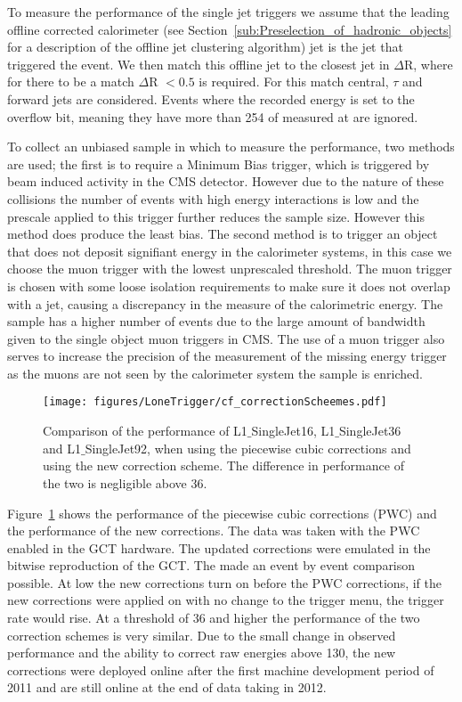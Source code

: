 To measure the performance of the \Lone single jet triggers we assume that the 
leading offline corrected \AK calorimeter (see 
Section~\ref{sub:Preselection_of_hadronic_objects} for a description of the 
offline jet clustering algorithm) jet is the jet that triggered the 
event. We then match this offline jet to the closest \Lone jet in $\Delta$R, 
where for there to be a match $\Delta$R $< 0.5$ is required. For this match 
central, $\tau$ and forward jets are considered. Events where the recorded 
\Lone energy is set to the overflow bit, meaning they have more than 
\unit{254}{\GeV} of \ET measured at \Lone are ignored.

To collect an unbiased sample in which to measure the performance, two 
methods are used; the first is to require a Minimum Bias trigger, which is 
triggered by beam induced activity in the CMS detector.
However due to the nature of these collisions the number of events with high 
energy interactions is low and the prescale applied to this trigger further 
reduces the sample size. However this method does produce the least bias.
The second method is to trigger an object that does not deposit signifiant 
energy in the calorimeter systems, in this case we choose the muon trigger with 
the lowest unprescaled \PT threshold. The muon trigger is chosen with some 
loose isolation requirements to make sure it does not overlap with a jet, 
causing a discrepancy in the measure of the calorimetric energy. The sample has 
a higher number of events due to the large amount of bandwidth given to the 
single object muon triggers in CMS. The use of a muon trigger also serves to 
increase the precision of the measurement of the \Lone missing energy trigger 
as the muons are not seen by the calorimeter system the \MET sample is enriched.

\begin{figure}[htbp]
  \centering
    \texttt{[image: figures/LoneTrigger/cf\_correctionScheemes.pdf]}
  \caption{Comparison of the performance of L1$\_$SingleJet16, L1$\_$SingleJet36 and L1$\_$SingleJet92, when using the piecewise cubic corrections and using the new correction scheme. The difference in performance of the two is negligible above 36\GeV.}
  \label{fig:figures_LoneTrigger_cf_correctionScheemes}
\end{figure}

Figure~\ref{fig:figures_LoneTrigger_cf_correctionScheemes} shows the 
performance of the piecewise cubic corrections (PWC) and the performance of the 
new corrections. The data was taken with the PWC enabled in the GCT hardware. 
The updated corrections were emulated in the bitwise reproduction of the GCT. 
The made an event by event comparison possible. At low \ET the new corrections 
turn on before the PWC corrections, if the new corrections were applied on with 
no change to the trigger menu, the \Lone trigger rate would rise. At a 
threshold of \unit{36}{\GeV} and higher the performance of the two correction 
schemes is very similar. Due to the small change in observed performance and 
the ability to correct raw energies above \unit{130}{\GeV}, the new corrections 
were deployed online after the first machine development period of 2011 and are 
still online at the end of data taking in 2012.

